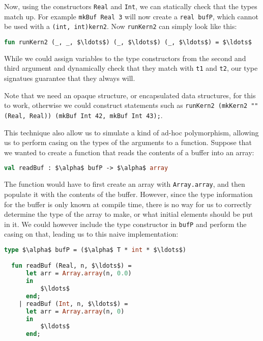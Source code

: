 Now, using the constructors \texttt{Real} and \texttt{Int}, we can
statically check that the types match up. For example \texttt{mkBuf
  Real 3} will now create a \texttt{real bufP}, which cannot be used
with a \texttt{(int, int)kern2}. Now \texttt{runKern2} can simply look
like this:

\begin{lstlisting}[language=ML, caption=runKern2 with type variables,
    label=runKern,mathescape]
  fun runKern2 (_, _, $\ldots$) (_, $\ldots$) (_, $\ldots$) = $\ldots$
\end{lstlisting}

While we could assign variables to the type constructors from the
second and third argument and dynamically check that they match with
\texttt{t1} and \texttt{t2}, our type signatues guarantee that they
always will.

Note that we need an opaque structure, or encapsulated data structures,
for this to work, otherwise we could construct statements such as
\texttt{runKern2 (mkKern2 "" (Real, Real)) (mkBuf Int 42, mkBuf Int
  43);}.

This technique also allow us to simulate a kind of ad-hoc
polymorphism, allowing us to perform casing on the types of the
arguments to a function. Suppose that we wanted to create a function
that reads the contents of a buffer into an array:

\begin{lstlisting}[language=ML, caption=readBuf signature, mathescape]
  val readBuf : $\alpha$ bufP -> $\alpha$ array
\end{lstlisting}

The function would have to first create an array with
\texttt{Array.array}, and then populate it with the contents of the
buffer. However, since the type information for the buffer is only
known at compile time, there is no way for us to correctly determine
the type of the array to make, or what initial elements should be put
in it. We could however include the type constructor in \texttt{bufP}
and perform the casing on that, leading us to this naive
implementation:

\begin{lstlisting}[language=ML, caption=Initial implementation of readBuf,
    mathescape]
  type $\alpha$ bufP = ($\alpha$ T * int * $\ldots$)

  fun readBuf (Real, n, $\ldots$) =
      let arr = Array.array(n, 0.0)
      in
          $\ldots$
      end;
    | readBuf (Int, n, $\ldots$) =
      let arr = Array.array(n, 0)
      in
          $\ldots$
      end;
\end{lstlisting}

